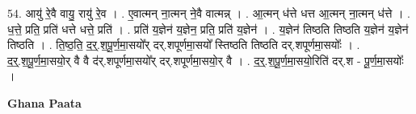 \documentclass[17pt]{extarticle}
\begin{document}
54. आयु॑ रे॒वै वायु॒ रायु॑ रे॒व । . ए॒वात्मन् ना॒त्मन् ने॒वै वात्मन्न् । . आ॒त्मन् ध॑त्ते धत्त आ॒त्मन् ना॒त्मन् ध॑त्ते । . ध॒त्ते॒ प्रति॒ प्रति॑ धत्ते धत्ते॒ प्रति॑ । . प्रति॑ य॒ज्ञेन॑ य॒ज्ञेन॒ प्रति॒ प्रति॑ य॒ज्ञेन॑ । . य॒ज्ञेन॑ तिष्ठति तिष्ठति य॒ज्ञेन॑ य॒ज्ञेन॑ तिष्ठति । . ति॒ष्ठ॒ति॒ द॒र्॒.श॒पू॒र्ण॒मा॒सयो᳚र् दर्.शपूर्णमा॒सयो᳚ स्तिष्ठति तिष्ठति दर्.शपूर्णमा॒सयोः᳚ । . द॒र्॒.श॒पू॒र्ण॒मा॒सयो॒र् वै वै द॑र्.शपूर्णमा॒सयो᳚र् दर्.शपूर्णमा॒सयो॒र् वै । . द॒र्॒.श॒पू॒र्ण॒मा॒सयो॒रिति॑ दर्.श - पू॒र्ण॒मा॒सयोः᳚ । \newline

\textbf{Ghana Paata } \newline
\end{document}
